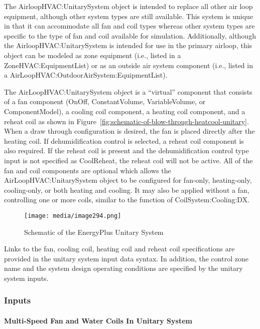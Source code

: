 The AirloopHVAC:UnitarySystem object is intended to replace all other air loop equipment, although other system types are still available. This system is unique in that it can accommodate all fan and coil types whereas other system types are specific to the type of fan and coil available for simulation. Additionally, although the AirloopHVAC:UnitarySystem is intended for use in the primary airloop, this object can be modeled as zone equipment (i.e., listed in a ZoneHVAC:EquipmentList) or as an outside air system component (i.e., listed in a AirLoopHVAC:OutdoorAirSystem:EquipmentList).

The AirLoopHVAC:UnitarySystem object is a ``virtual'' component that consists of a fan component (OnOff, ConstantVolume, VariableVolume, or ComponentModel), a cooling coil component, a heating coil component, and a reheat coil as shown in Figure~\ref{fig:schematic-of-blow-through-heatcool-unitary}. When a draw through configuration is desired, the fan is placed directly after the heating coil. If dehumidification control is selected, a reheat coil component is also required. If the reheat coil is present and the dehumidification control type input is not specified as CoolReheat, the reheat coil will not be active. All of the fan and coil components are optional which allows the AirLoopHVAC:UnitarySystem object to be configured for fan-only, heating-only, cooling-only, or both heating and cooling. It may also be applied without a fan, controlling one or more coils, similar to the function of CoilSystem:Cooling:DX.

\begin{figure}[hbtp] %
\centering
\texttt{[image: media/image294.png]}
\caption{Schematic of the EnergyPlus Unitary System \protect \label{fig:schematic-of-the-energyplus-unitary-system}}
\end{figure}

Links to the fan, cooling coil, heating coil and reheat coil specifications are provided in the unitary system input data syntax. In addition, the control zone name and the system design operating conditions are specified by the unitary system inputs.

\subsubsection{Inputs}\label{inputs-049}

\paragraph{Multi-Speed Fan and Water Coils In Unitary System}\label{multi-speed-fan-and-water-coils-in-unitary-system}


